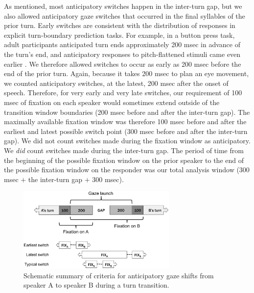 \documentclass[authoryear, 12pt]{elsarticle}
\begin{document}
As mentioned, most anticipatory switches happen in the inter-turn gap, but we also allowed anticipatory gaze switches that occurred in the final syllables of the prior turn. Early switches are consistent with the distribution of responses in explicit turn-boundary prediction tasks. For example, in a button press task, adult participants anticipated turn ends approximately 200 msec in advance of the turn's end, and anticipatory responses to pitch-flattened stimuli came even earlier \citep{de-ruiter2006}. We therefore allowed switches to occur as early as 200 msec before the end of the prior turn. Again, because it takes 200 msec to plan an eye movement, we counted anticipatory switches, at the latest, 200 msec after the onset of speech. Therefore, for very early and very late switches, our requirement of 100 msec of fixation on each speaker would sometimes extend outside of the transition window boundaries (200 msec before and after the inter-turn gap). The maximally available fixation window was therefore 100 msec before and after the earliest and latest possible switch point (300 msec before and after the inter-turn gap). We did not count switches made during the fixation window as anticipatory. We \textit{did} count switches made during the inter-turn gap. The period of time from the beginning of the possible fixation window on the prior speaker to the end of the possible fixation window on the responder was our total analysis window (300 msec $+$ the inter-turn gap $+$ 300 msec).

\begin{figure}[t]
\begin{center}
\includegraphics[width=0.7\textwidth]{figures/FIG-AnticipCriteria.png}
\end{center}
\caption{Schematic summary of criteria for anticipatory gaze shifts from speaker A to speaker B during a turn transition.} 
\label{fig:criterion}
\end{figure}
\end{document}
